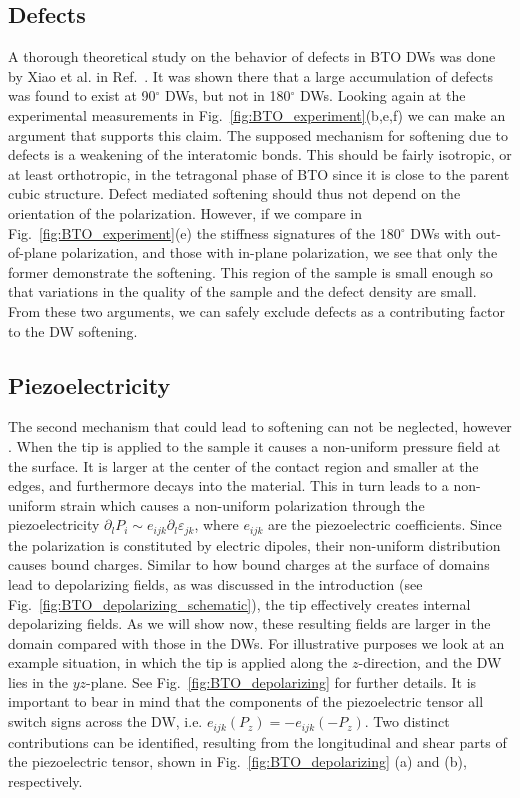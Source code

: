 \subsection{Defects}
A thorough theoretical study on the behavior of defects in BTO DWs was done by Xiao et al. in Ref.~\cite{Xiao2005}.
It was shown there that a large accumulation of defects was found to exist at 90$^\circ$ DWs, but not in 180$^\circ$ DWs.
Looking again at the experimental measurements in Fig.~\ref{fig:BTO_experiment}(b,e,f) we can make an argument that supports this claim.
The supposed mechanism for softening due to defects is a weakening of the interatomic bonds.
This should be fairly isotropic, or at least orthotropic, in the tetragonal phase of BTO since it is close to the parent cubic structure.
Defect mediated softening should thus not depend on the orientation of the polarization.
However, if we compare in Fig.~\ref{fig:BTO_experiment}(e) the stiffness signatures of the 180$^\circ$ DWs with out-of-plane polarization, and those with in-plane polarization, we see that only the former demonstrate the softening.
This region of the sample is small enough so that variations in the quality of the sample and the defect density are small.
From these two arguments, we can safely exclude defects as a contributing factor to the DW softening.

\subsection{Piezoelectricity}
The second mechanism that could lead to softening can not be neglected, however \cite{Tsuji2005,Stefani2020}.
When the tip is applied to the sample it causes a non-uniform pressure field at the surface.
It is larger at the center of the contact region and smaller at the edges, and furthermore decays into the material.
This in turn leads to a non-uniform strain which causes a non-uniform polarization through the piezoelectricity $\partial_l P_i \sim e_{ijk} \partial_l \varepsilon_{jk}$, where $e_{ijk}$ are the piezoelectric coefficients.
Since the polarization is constituted by electric dipoles, their non-uniform distribution causes bound charges.
Similar to how bound charges at the surface of domains lead to depolarizing fields, as was discussed in the introduction (see Fig.~\ref{fig:BTO_depolarizing_schematic}), the tip effectively creates internal depolarizing fields. 
As we will show now, these resulting fields are larger in the domain compared with those in the DWs.
For illustrative purposes we look at an example situation, in which the tip is applied along the $z$-direction, and the DW lies in the $yz$-plane. See Fig.~\ref{fig:BTO_depolarizing} for further details.
It is important to bear in mind that the components of the piezoelectric tensor all switch signs across the DW, i.e. $e_{ijk}(P_z) = - e_{ijk}(-P_z)$. 
Two distinct contributions can be identified, resulting from the longitudinal and shear parts of the piezoelectric tensor, shown in Fig.~\ref{fig:BTO_depolarizing} (a) and (b), respectively.

